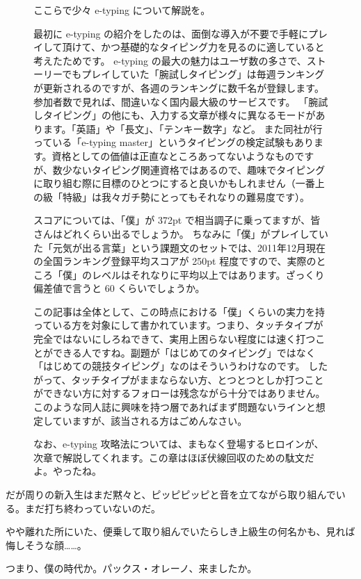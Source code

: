 \begin{figure}
\begin{screen}
ここらで少々 e-typing について解説を。

最初に e-typing の紹介をしたのは、面倒な導入が不要で手軽にプレイして頂けて、かつ基礎的なタイピング力を見るのに適していると考えたためです。
e-typing の最大の魅力はユーザ数の多さで、ストーリーでもプレイしていた「腕試しタイピング」は毎週ランキングが更新されるのですが、各週のランキングに数千名が登録します。参加者数で見れば、間違いなく国内最大級のサービスです。
「腕試しタイピング」の他にも、入力する文章が様々に異なるモードがあります。「英語」や「長文」、「テンキー数字」など。
また同社が行っている「e-typing master」というタイピングの検定試験もあります。資格としての価値は正直なところあってないようなものですが、数少ないタイピング関連資格ではあるので、趣味でタイピングに取り組む際に目標のひとつにすると良いかもしれません（一番上の級「特級」は我々ガチ勢にとってもそれなりの難易度です）。

スコアについては、「僕」が 372pt で相当調子に乗ってますが、皆さんはどれくらい出るでしょうか。
ちなみに「僕」がプレイしていた「元気が出る言葉」という課題文のセットでは、2011年12月現在の全国ランキング登録平均スコアが 250pt 程度ですので、実際のところ「僕」のレベルはそれなりに平均以上ではあります。ざっくり偏差値で言うと 60 くらいでしょうか。

この記事は全体として、この時点における「僕」くらいの実力を持っている方を対象にして書かれています。つまり、タッチタイプが完全ではないにしろねできて、実用上困らない程度には速く打つことができる人ですね。副題が「はじめてのタイピング」ではなく「はじめての競技タイピング」なのはそういうわけなのです。
したがって、タッチタイプがままならない方、とつとつとしか打つことができない方に対するフォローは残念ながら十分ではありません。このような同人誌に興味を持つ層であればまず問題ないラインと想定していますが、該当される方はごめんなさい。

なお、e-typing 攻略法については、まもなく登場するヒロインが、次章で解説してくれます。この章はほぼ伏線回収のための駄文だよ。やったね。
\end{screen}
\end{figure}

だが周りの新入生はまだ黙々と、ピッピピッピと音を立てながら取り組んでいる。まだ打ち終わっていないのだ。

やや離れた所にいた、便乗して取り組んでいたらしき上級生の何名かも、見れば悔しそうな顔……。

つまり、僕の時代か。パックス・オレーノ、来ましたか。

